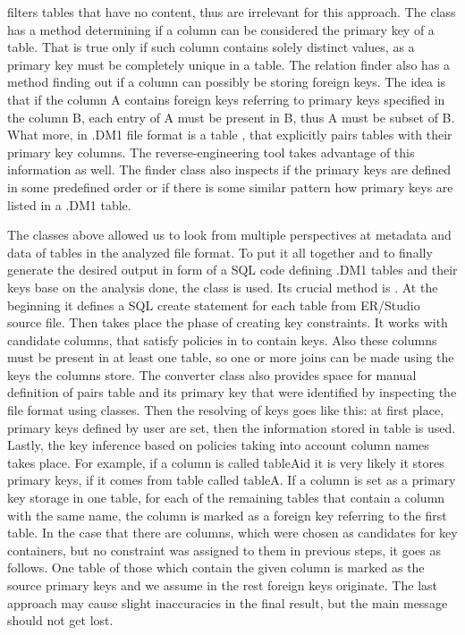  filters tables that have no content, thus are irrelevant for this approach.
The class has a method determining if a column can be considered the primary key of a table. 
That is true only if such column contains solely distinct values, as a primary key must be completely unique in a table.
The relation finder also has a method finding out if a column can possibly be storing foreign keys. The idea is that if the column A contains foreign keys referring to primary keys specified in the column B, each entry of A must be present in B, thus A must be subset of B.
What more, in .DM1 file format is a table , that explicitly pairs tables with their primary key columns. 
The reverse-engineering tool takes advantage of this information as well.
The finder class also inspects if the primary keys are defined in some predefined order or if there is some similar pattern how primary keys are listed in a .DM1 table.

The classes above allowed us to look from multiple perspectives at metadata and data of tables in the analyzed file format.
To put it all together and to finally generate the desired output in form of a SQL code defining .DM1 tables and their keys base on the analysis done, the class  is used.
Its crucial method is . 
At the beginning it defines a SQL create statement for each table from ER/Studio source file. 
Then takes place the phase of creating key constraints. 
It works with candidate columns, that satisfy policies in  to contain keys.
Also these columns must be present in at least one table, so one or more joins can be made using the keys the columns store.
The converter class also provides space for manual definition of pairs table and its primary key that were identified by inspecting the file format using  classes.
Then the resolving of keys goes like this: at first place, primary keys defined by user are set, then the information stored in  table is used. Lastly, the key inference based on policies taking into account column names takes place. 
For example, if a column is called tableA\textunderscore id it is very likely it stores primary keys, if it comes from table called tableA.
If a column is set as a primary key storage in one table, for each of the remaining tables that contain a column with the same name, the column is marked as a foreign key referring to the first table.
In the case that there are columns, which were chosen as candidates for key containers, but no constraint was assigned to them in previous steps, it goes as follows. One table of those which contain the given column is marked as the source primary keys and we assume in the rest foreign keys originate. The last approach may cause slight inaccuracies in the final result, but the main message should not get lost.

